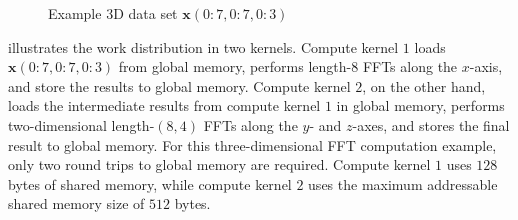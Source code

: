 \documentclass[11pt, onecolumn, journal,compsoc]{IEEEtran}
\theoremstyle{problemstyle}
\begin{document}
\begin{figure}[H]
  \caption{Example 3D data set $\bm{x}(0 \colon 7,0 \colon 7,0 \colon 3)$}
  \label{fig:example_data_set_1}
  \end{figure}

   illustrates the work distribution in two kernels. Compute kernel $1$ loads $\bm{x}(0 \colon 7,0 \colon 7,0 \colon 3)$ from global memory, performs length-$8$ FFTs along the $x$-axis, and store the results to global memory. Compute kernel $2$, on the other hand, loads the intermediate results from compute kernel $1$ in global memory, performs two-dimensional length-$(8,4)$ FFTs along the $y$- and $z$-axes, and stores the final result to global memory. For this three-dimensional FFT computation example, only two round trips to global memory are required. Compute kernel $1$ uses $128$ bytes of shared memory, while compute kernel $2$ uses the maximum addressable shared memory size of $512$ bytes.
\end{document}
